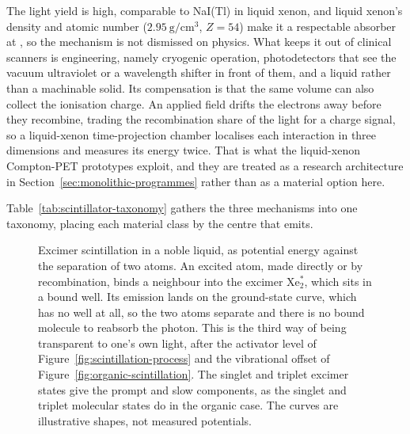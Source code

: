 The light yield is high, comparable to NaI(Tl) in liquid xenon, and liquid xenon's density and atomic number ($\qty{2.95}{\gram\per\centi\metre\cubed}$, $Z=54$) make it a respectable absorber at , so the mechanism is not dismissed on physics.
What keeps it out of clinical scanners is engineering, namely cryogenic operation, photodetectors that see the vacuum ultraviolet or a wavelength shifter in front of them, and a liquid rather than a machinable solid.
Its compensation is that the same volume can also collect the ionisation charge.
An applied field drifts the electrons away before they recombine, trading the recombination share of the light for a charge signal, so a liquid-xenon time-projection chamber localises each interaction in three dimensions and measures its energy twice.
That is what the liquid-xenon Compton-PET prototypes exploit, and they are treated as a research architecture in Section~\ref{sec:monolithic-programmes} rather than as a material option here.

Table~\ref{tab:scintillator-taxonomy} gathers the three mechanisms into one taxonomy, placing each material class by the centre that emits.

\begin{figure}[p] %
	\centering
	
	\caption[Noble-element excimer scintillation]{%
		Excimer scintillation in a noble liquid, as potential energy against the separation of two atoms.
		An excited atom, made directly or by recombination, binds a neighbour into the excimer Xe$_2^*$, which sits in a bound well.
Its emission lands on the ground-state curve, which has no well at all, so the two atoms separate and there is no bound molecule to reabsorb the photon.
		This is the third way of being transparent to one's own light, after the activator level of Figure~\ref{fig:scintillation-process} and the vibrational offset of Figure~\ref{fig:organic-scintillation}.
		The singlet and triplet excimer states give the prompt and slow components, as the singlet and triplet molecular states do in the organic case.
		The curves are illustrative shapes, not measured potentials.
	}
	\label{fig:excimer-scintillation}
\end{figure}

\clearpage

